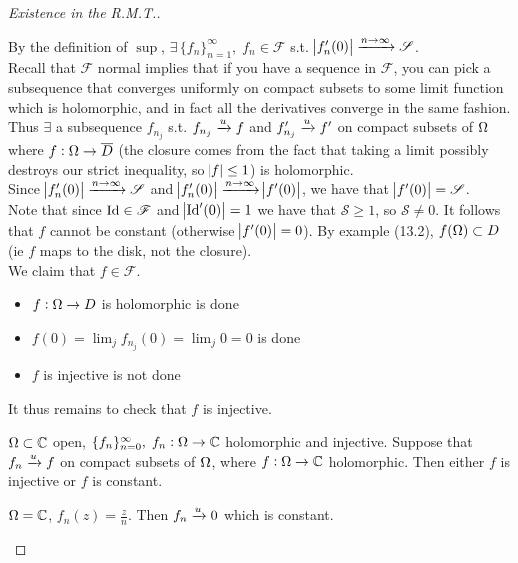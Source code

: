 \begin{proof}[Existence in the R.M.T.]
\begin{enumerate}
By the definition of $\sup$, $\exists \, \{ f_n\}_{n=1}^\infty, \; f_n \in \mathscr{F}$ s.t. $\abs{f_n' (0)} \xrightarrow[]{n \to \infty} \mathscr{S}$.\\

Recall that $\mathscr{F}$ normal implies that if you have a sequence in $\mathscr{F}$, you can pick a subsequence that converges uniformly on compact subsets to some limit function which is holomorphic, and in fact all the derivatives converge in the same fashion.\\

Thus $\exists$ a subsequence $f_{n_j}$ s.t. $f_{n_j} \xrightarrow[]{u} f $ and $f_{n_j}' \xrightarrow[]{u} f' $ on compact subsets of $\Omega$ where $f: \Omega \to \overline{D}$ (the closure comes from the fact that taking a limit possibly destroys our strict inequality, so $\abs{f} \leq 1$) is holomorphic.\\

Since $\abs{f_n' (0)} \xrightarrow[]{n \to \infty} \mathscr{S}$ and $\abs{f_n' (0)} \xrightarrow[]{n \to \infty} \abs{f'(0)}$, we have that $\abs{f'(0)} = \mathscr{S}$.\\

Note that since $\mathrm{Id}  \in \mathscr{F}$ and $\abs{  \mathrm{Id} '(0)  } = 1$ we have that $\mathscr{S} \geq 1$, so $\mathscr{S} \neq 0$. It follows that $f$ cannot be constant (otherwise $\abs{f'(0)} =0$). By example (13.2), $f(\Omega) \subset D$ (ie $f$ maps to the disk, not the closure).\\

We claim that $f \in \mathscr{F}$.

\begin{itemize}
    \item $f: \Omega \to D$ is holomorphic is done
    \item $f(0) = \lim_j f_{n_j} (0) = \lim_j 0 = 0$ is done
    \item $f$ is injective is not done
\end{itemize}

It thus remains to check that $f$ is injective.

\begin{lemma}
$\Omega \subset \mathbb{C}$ open, $\{f_n\}_{n=0}^\infty, \; f_n : \Omega \to \mathbb{C}$ holomorphic and injective. Suppose that $f_n \xrightarrow[]{u} f$ on compact subsets of $\Omega$, where $f:\Omega \rightarrow \mathbb{C}$ holomorphic. Then either $f$ is injective or $f$ is constant.
\end{lemma}

\begin{example}
$\Omega = \mathbb{C}$, $f_n(z) = \frac{z}{n}$. Then $f_n \xrightarrow[]{u} 0$ which is constant.
\end{example}


\end{enumerate}
\end{proof}
